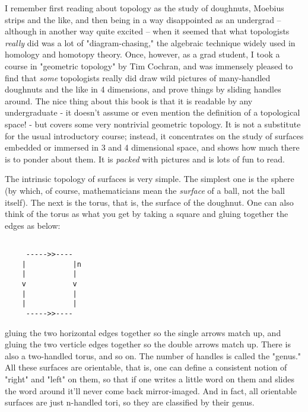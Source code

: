 I remember first reading about topology as the study of doughnuts,
Moebius strips and the like, and then being in a way disappointed as an
undergrad -- although in another way quite excited --  when it seemed
that what topologists \emph{really} did was a lot of "diagram-chasing," the
algebraic technique widely used in homology and homotopy theory.  Once,
however, as a grad student, I took a course in "geometric topology" by
Tim Cochran, and was immensely pleased to find that \emph{some} topologists
really did draw wild pictures of many-handled doughnuts and the like in
4 dimensions, and prove things by sliding handles around.  The nice
thing about this book is that it is readable by any undergraduate - it
doesn't assume or even mention the definition of a topological space! -
but covers some very nontrivial geometric topology.  It is not a
substitute for the usual introductory course; instead, it concentrates
on the study of surfaces embedded or immersed in 3 and 4 dimensional
space, and shows how much there is to ponder about them.  It is \emph{packed}
with pictures and is lots of fun to read.

The intrinsic topology of surfaces is very simple.  The simplest one is
the sphere (by which, of course, mathematicians mean the \emph{surface} of a
ball, not the ball itself).  The next is the torus, that is, the surface
of the doughnut.   One can also think of the torus as what you get by
taking a square and gluing together the edges as below:



\begin{verbatim}

     ----->>----
    |           |n
    |           |  
    v           v
    |           |
    |           |
     ----->>----

\end{verbatim}
    

gluing the two horizontal edges together so the single arrows match up, and
gluing the two verticle edges together so the double arrows match up.
There is also a two-handled torus, and so on.  The number of handles is called
the "genus."   All these surfaces are orientable, that is, one can
define a consistent notion of "right" and "left" on them, so that if one
writes a little word on them and slides the word around it'll never come
back mirror-imaged.  And in fact, all orientable surfaces are just
n-handled tori, so they are classified by their genus.  

